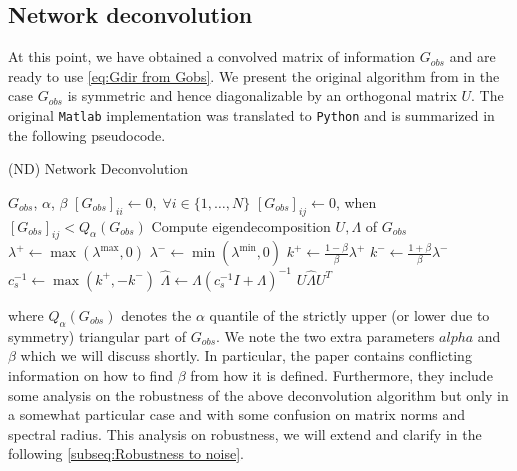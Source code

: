 \documentclass[../Thesis.tex]{subfiles}
\begin{document}
\subsection{Network deconvolution}
At this point, we have obtained a convolved matrix of information $G_{obs}$ and are ready to use \autoref{eq:Gdir from Gobs}. We present the original algorithm from \cite{Network-deconvolution-as-a-general-method-to-distinguish-direct-dependencies-in-networks} in the case $G_{obs}$ is symmetric and hence diagonalizable by an orthogonal matrix $U$. The original \texttt{Matlab} implementation was translated to \texttt{Python} and is summarized in the following pseudocode.
\begin{algorithm}[H]
    \caption{(ND) Network Deconvolution}\label{alg:ND}
    \begin{algorithmic}
        \Require $G_{obs}$, $\alpha$, $\beta$             %
        \State $\left[G_{obs}\right]_{ii} \gets 0, \; \forall i\in \{1,\dots, N\}$                    
        \State $\left[G_{obs}\right]_{ij} \gets 0$, when $\left[G_{obs}\right]_{ij} < Q_{\alpha}\left(G_{obs}\right)$
        \State Compute eigendecomposition $U,\Lambda$ of $G_{obs}$
        \State $\lambda^+ \gets  \max{ \left( \lambda^{\text{max}},0 \right) }$
        \State $\lambda^- \gets \min{ \left( \lambda^{\text{min}},0 \right) }$
        \State $k^+ \gets \frac{1-\beta}{\beta} \lambda^+$
        \State $k^- \gets \frac{1+\beta}{\beta} \lambda^-$
        \State $c_s^{-1} \gets \max{\left( k^+, - k^- \right)}$
        \State $\hat{\Lambda} \gets \Lambda \left(c_s^{-1}I + \Lambda\right)^{-1}$
        \State \Return $U \hat{\Lambda} U^T$
    \end{algorithmic}
\end{algorithm}
where $Q_{\alpha} \left(G_{obs}\right)$ denotes the $\alpha$ quantile of the strictly upper (or lower due to symmetry) triangular part of $G_{obs}$. We note the two extra parameters $alpha$ and $\beta$ which we will discuss shortly. In particular, the paper contains conflicting information on how to find $\beta$ from how it is defined. Furthermore, they include some analysis on the robustness of the above deconvolution algorithm but only in a somewhat particular case and with some confusion on matrix norms and spectral radius. This analysis on robustness, we will extend and clarify in the following \autoref{subseq:Robustness to noise}.
\end{document}
